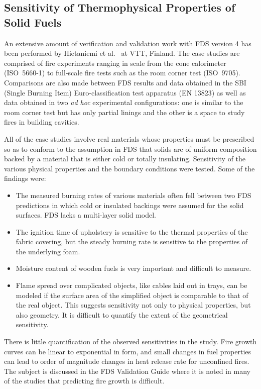 \documentclass[11pt]{book}
\begin{document}
\subsection{Sensitivity of Thermophysical Properties of Solid Fuels}

An  extensive amount  of  verification and  validation  work with  FDS version 4  has been  performed by Hietaniemi et al.~\cite{Hietaniemi:1} at VTT,
Finland. The case  studies are  comprised of fire  experiments   ranging  in   scale  from  the   cone  calorimeter (ISO~5660-1)
to  full-scale fire  tests such as  the room  corner test (ISO~9705).  Comparisons are also  made between  FDS results  and data obtained  in the
SBI (Single  Burning Item)  Euro-classification test apparatus (EN  13823) as  well as  data obtained in  two {\em  ad hoc} experimental
configurations:  one is similar  to the room  corner test but has only  partial linings and the other is a  space to study fires in building
cavities.

All of the  case studies involve real materials  whose properties must be prescribed  so as to conform  to the assumption in  FDS that solids are of
uniform composition backed by a material that is either cold or totally insulating. Sensitivity of the various physical properties and the boundary
conditions were tested. Some of the findings were:
\begin{itemize}
\item  The measured  burning  rates of  various  materials often  fell
between two FDS  predictions in which cold or  insulated backings were assumed for the solid surfaces. FDS lacks a multi-layer solid model.
\item  The ignition  time of  upholstery is  sensitive to  the thermal
properties  of the  fabric covering,  but the  steady burning  rate is sensitive to the properties of the underlying foam.
\item Moisture content of wooden fuels is very important and difficult
to measure.
\item Flame spread  over complicated objects, like cables  laid out in
trays, can be modeled if the  surface area of the simplified object is comparable to that  of the real object. This  suggests sensitivity not only to
physical properties,  but also geometry.  It is  difficult to quantify the extent of the geometrical sensitivity.
\end{itemize}
There is  little quantification of  the observed sensitivities  in the study. Fire  growth curves can be  linear to exponential  in form, and small
changes in  fuel  properties  can lead  to  order of  magnitude changes  in heat  release rate  for unconfined  fires. The  subject is
discussed  in the  FDS  Validation Guide \cite{FDS_Validation_Guide} where it is  noted in many of the studies  that predicting fire growth is difficult.
\end{document}
